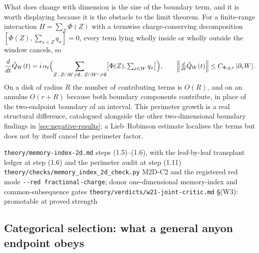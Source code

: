What does change with dimension is the size of the boundary term, and it is
worth displaying because it is the obstacle to the limit theorem. For a
finite-range interaction $H=\sum_Z\Phi(Z)$ with a termwise charge-conserving
decomposition $[\Phi(Z),\sum_{x\in Z}q_x]=0$, every term lying wholly inside or
wholly outside the window cancels, so
\begin{equation}
  \frac{d}{dt}\hat{Q}_W(t)
   = i\,\alpha_t\Bigl(
       \sum_{Z\,:\,Z\cap W\ne\emptyset,\ Z\cap W^{c}\ne\emptyset}
       \bigl[\Phi(Z),\textstyle\sum_{x\in W}q_x\bigr]\Bigr),
  \qquad
  \Bigl\lVert\frac{d}{dt}\hat{Q}_W(t)\Bigr\rVert
   \le C_{\Phi,q,r}\,\lvert \partial_r W\rvert.
  \label{eq:2d-perimeter}
\end{equation}
On a disk of radius $R$ the number of contributing terms is $O(R)$, and on an
annulus $O(r+R)$ because both boundary components contribute, in place of the
two-endpoint boundary of an interval. This perimeter growth is a real
structural difference, catalogued alongside the other two-dimensional boundary
findings in \cref{sec:negative-results}; a Lieb--Robinson estimate localises
the terms but does not by itself cancel the perimeter factor.

%
{\texttt{theory/memory-index-2d.md} steps (1.5)--(1.6), with the leaf-by-leaf
transplant ledger at step (1.6) and the perimeter audit at step (1.11)}%
{\texttt{theory/checks/memory\_index\_2d\_check.py} M2D-C2 and the registered
red mode \texttt{-{}-red fractional-charge}; donor one-dimensional
memory-index and common-subsequence gates}%
{\texttt{theory/verdicts/w21-joint-critic.md} \S(W3): promotable at proved
strength}

\subsection{Categorical selection: what a general anyon endpoint obeys}

